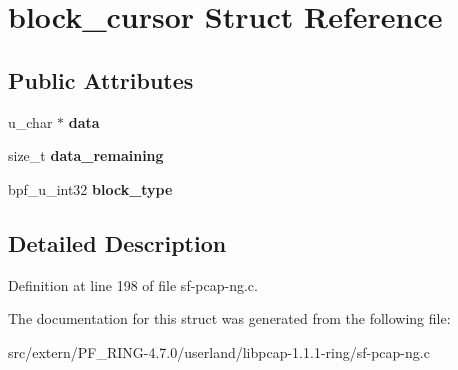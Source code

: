 \hypertarget{structblock__cursor}{
\section{block\_\-cursor Struct Reference}
\label{structblock__cursor}
}
\subsection*{Public Attributes}
\begin{DoxyCompactItemize}
\item 
\hypertarget{structblock__cursor_a0882ca37406c1545ca2e04d856948f3a}{
u\_\-char $\ast$ {\bfseries data}}
\label{structblock__cursor_a0882ca37406c1545ca2e04d856948f3a}

\item 
\hypertarget{structblock__cursor_a40dd1e93abb9e159b24147e366e822e2}{
size\_\-t {\bfseries data\_\-remaining}}
\label{structblock__cursor_a40dd1e93abb9e159b24147e366e822e2}

\item 
\hypertarget{structblock__cursor_a8112cf0aa43fc58328f4c55f147fed11}{
bpf\_\-u\_\-int32 {\bfseries block\_\-type}}
\label{structblock__cursor_a8112cf0aa43fc58328f4c55f147fed11}

\end{DoxyCompactItemize}


\subsection{Detailed Description}


Definition at line 198 of file sf-\/pcap-\/ng.c.



The documentation for this struct was generated from the following file:\begin{DoxyCompactItemize}
\item 
src/extern/PF\_\-RING-\/4.7.0/userland/libpcap-\/1.1.1-\/ring/sf-\/pcap-\/ng.c\end{DoxyCompactItemize}
